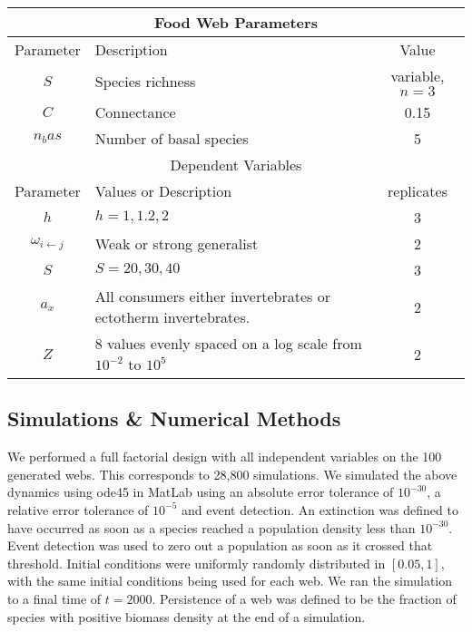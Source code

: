 \documentclass[11pt]{amsart}
\begin{document}
\begin{tabularx}{\textwidth}{|c|X|c|}
\hline
\hline
\multicolumn{3}{|c|}{Food Web Parameters}\\
\hline
Parameter&Description&Value\\
\hline
$S$&Species richness&variable, $n=3$\\
$C$&Connectance & 0.15\\
$n_bas$&Number of basal species&5\\
\hline
\hline
\multicolumn{3}{|c|}{Dependent Variables}\\
\hline
Parameter & Values or Description & replicates\\
$h$&$h=1,1.2,2$&3\\
$\omega_{i\leftarrow j}$&Weak or strong generalist&2\\
$S$&$S=20,30,40$&3\\
$a_x$&All consumers either invertebrates or ectotherm invertebrates. & 2\\
$Z$&8 values evenly spaced on a log scale from $10^{-2}$ to $10^5$ & 2\\
\hline
\end{tabularx}


\subsection{Simulations \& Numerical Methods}
We performed a full factorial design with all independent variables on the 100 generated webs.  This corresponds to 28,800 simulations.  We simulated the above dynamics using ode45 in MatLab using an absolute error tolerance of $10^{-30}$, a relative error tolerance of $10^{-5}$ and event detection.  An extinction was defined to have occurred as soon as a species reached a population density less than $10^{-30}$.  Event detection was used to zero out a population as soon as it crossed that threshold.  Initial conditions were uniformly randomly distributed in $[0.05,1]$, with the same initial conditions being used for each web.  We ran the simulation to a final time of $t=2000$.  Persistence of a web was defined to be the fraction of species with positive biomass density at the end of a simulation.
\end{document}
